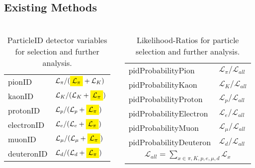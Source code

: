 \documentclass[aspectratio=169]{beamer}
\newcommand{\mathcolorbox}[2]{\colorbox{#1}{$\displaystyle #2$}}
\begin{document}
\subsection{Existing Methods}
\begin{frame}
	\frametitle{\insertsection}
	\framesubtitle{\insertsubsection}

	\begin{columns}
		\begin{column}{0.47\textwidth}
			\begin{table}
				\begin{tabular}{l|l}
					pionID & $\mathcal{L}_{\pi} / (\mathcolorbox{yellow}{\mathcal{L}_{\pi}} + \mathcal{L}_{K})$ \\
					kaonID & $\mathcal{L}_{K} / (\mathcal{L}_{K} +\mathcolorbox{yellow}{\mathcal{L}_{\pi}})$ \\
					protonID & $\mathcal{L}_{p} / (\mathcal{L}_{p} +\mathcolorbox{yellow}{\mathcal{L}_{\pi}})$ \\
					electronID & $\mathcal{L}_{e} / (\mathcal{L}_{e} +\mathcolorbox{yellow}{\mathcal{L}_{\pi}})$ \\
					muonID & $\mathcal{L}_{\mu} / (\mathcal{L}_{\mu} +\mathcolorbox{yellow}{\mathcal{L}_{\pi}})$ \\
					deuteronID & $\mathcal{L}_{d} / (\mathcal{L}_{d} +\mathcolorbox{yellow}{\mathcal{L}_{\pi}})$
				\end{tabular}
				\caption{ParticleID detector variables for selection and further analysis.}
			\end{table}
		\end{column}
		\begin{column}{0.5\textwidth}
			\begin{table}
				\begin{tabular}{l|l}
					pidProbabilityPion & $\mathcal{L}_{\pi} / \mathcal{L}_{all}$ \\
					pidProbabilityKaon & $\mathcal{L}_{K} / \mathcal{L}_{all}$ \\
					pidProbabilityProton & $\mathcal{L}_{p} / \mathcal{L}_{all}$ \\
					pidProbabilityElectron & $\mathcal{L}_{e} / \mathcal{L}_{all}$ \\
					pidProbabilityMuon & $\mathcal{L}_{\mu} / \mathcal{L}_{all}$ \\
					pidProbabilityDeuteron & $\mathcal{L}_{d} / \mathcal{L}_{all}$ \\
					\hline
					\multicolumn{2}{c}{$\mathcal{L}_{all} = \sum \limits_{x \in {\pi, K, p, e, \mu, d}} \mathcal{L}_{x}$}
				\end{tabular}
				\caption{Likelihood-Ratios for particle selection and further analysis.}
			\end{table}
		\end{column}
	\end{columns}
\end{frame}
\end{document}

